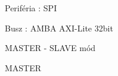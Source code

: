 \documentclass[12pt]{article}
\begin{document}
Periféria : SPI

Busz : AMBA AXI-Lite 32bit

MASTER - SLAVE mód

MASTER
\end{document}
